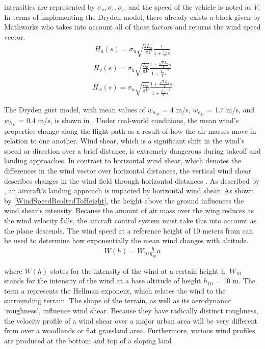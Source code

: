 \documentclass[conference]{IEEEtran}
\begin{document}
intensities are represented by $\sigma_u, \sigma_v, \sigma_w$ and the speed of
the vehicle is noted as $V$. In terms of implementing the Dryden model, there
already exists a block given by Mathworks who takes into account all of those
factors and returns the wind speed vector.
\begin{align}
    H_u(s)={\sigma_u\sqrt{\frac{2L_u}{\pi V}}}\frac{1}{1+\frac{L_u}{V}s}
\end{align}
\begin{align}
    H_v(s)={\sigma_u\sqrt{\frac{L_v}{\pi V}}}\frac{1+\frac{\sqrt{3}L_v}{V}s}{{1+\frac{L_v}{V}s}^2}
\end{align}
\begin{align}
    H_w(s)={\sigma_u\sqrt{\frac{L_w}{\pi V}}}\frac{1+\frac{\sqrt{3}L_w}{V}s}{{1+\frac{L_w}{V}s}^2}
\end{align}
\par
The Dryden gust model, with mean values of $w_{n_M}$ = 4 m/s, $w_{e_M}$ = 1.7
m/s, and $w_{h_M}$ = 0.4 m/s, is shown in {\cite{UTC}}. Under real-world
conditions, the mean wind's properties change along the flight path as a result
of how the air masses move in relation to one another. Wind shear, which is a
significant shift in the wind's speed or direction over a brief distance, is
extremely dangerous during takeoff and landing
approaches{\cite{Equations_of_Motion}}. In contrast to horizontal wind shear,
which denotes the differences in the wind vector over horizontal distances, the
vertical wind shear describes changes in the wind field through horizontal
distances {\cite{Wind_Sheer}}. As described by {\cite{Wind_Sheer}}, an
aircraft's landing approach is impacted by horizontal wind shear. As shown by
    {\ref{WindSpeedRealtedToHeight}}, the height above the ground influences the
wind shear's intensity. Because the amount of air mass over the wing reduces as
the wind velocity falls, the aircraft control system must take this into
account as the plane descends. The wind speed at a reference height of 10
meters from {\cite{Wind_speed}} can be used to determine how exponentially the
mean wind changes with altitude.
\begin{align}
    W(h)=W_{10}{\frac{h}{h_{10}}}a
    \label{WindSpeedRealtedToHeight}
\end{align}
\par
where $W(h)$ states for the intensity of the wind at a certain height h.
$W_{10}$ stands for the intensity of the wind at a base altitude of height
$h_{10}$ = 10 m. The term a represents the Hellman exponent, which relates the
wind to the surrounding terrain{\cite{UTC}}. The shape of the terrain, as well
as its aerodynamic `roughness', influence wind shear. Because they have
radically distinct roughness, the velocity profile of a wind shear over a major
urban area will be very different from over a woodlands or flat grassland area.
Furthermore, various wind profiles are produced at the bottom and top of a
sloping land {\cite{Wind_profiles}}.
\end{document}
